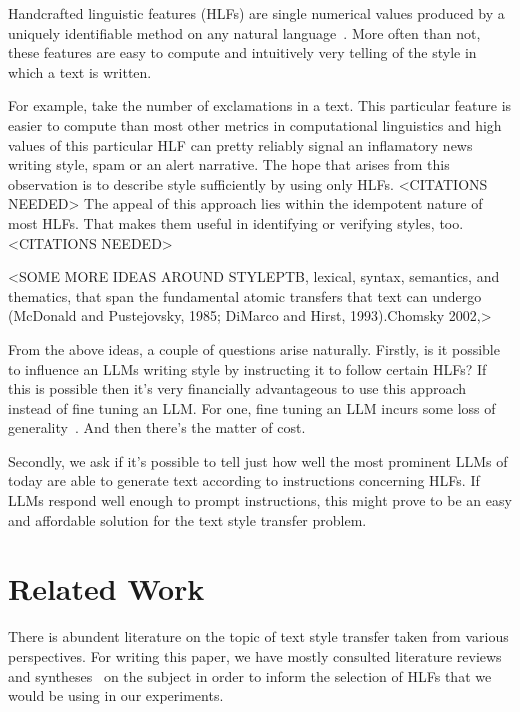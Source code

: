 \documentclass[runningheads,a4paper,11pt]{article}
\begin{document}
Handcrafted linguistic features (HLFs) are single numerical values produced by a
uniquely identifiable method on any natural language~\cite{lftk-2023}. More
often than not, these features are easy to compute and intuitively very telling
of the style in which a text is written.

For example, take the number of exclamations in a text.
This particular feature is easier to compute than most other metrics in
computational linguistics and high values of this particular HLF can pretty
reliably signal an inflamatory news writing style, spam or an alert narrative.
The hope that arises from this observation is to describe style sufficiently by
using only HLFs.
<CITATIONS NEEDED>
The appeal of this approach lies within the idempotent nature of most HLFs.
That makes them useful in identifying or verifying styles, too. <CITATIONS NEEDED>

<SOME MORE IDEAS AROUND STYLEPTB, lexical, syntax, semantics,
and thematics, that span the fundamental atomic
transfers that text can undergo (McDonald and
Pustejovsky, 1985; DiMarco and Hirst, 1993).Chomsky 2002,>

From the above ideas, a couple of questions arise naturally.
Firstly, is it possible to influence an LLMs writing style by instructing it to
follow certain HLFs?
If this is possible then it's very financially advantageous to use this approach
instead of fine tuning an LLM.
For one, fine tuning an LLM incurs some loss of generality~\cite{yang2024unveiling}.
And then there's the matter of cost.

Secondly, we ask if it's possible to tell just how well the most prominent LLMs
of today are able to generate text according to instructions concerning HLFs.
If LLMs respond well enough to prompt instructions, this might prove to be an
easy and affordable solution for the text style transfer problem.

\section{Related Work}\label{related}

There is abundent literature on the topic of text style transfer taken from
various perspectives.
For writing this paper, we have mostly consulted literature reviews and
syntheses~\cite{tst-review-2021,tst-survey-2022} on the subject in order to
inform the selection of HLFs that we would be using in our experiments.
\end{document}
